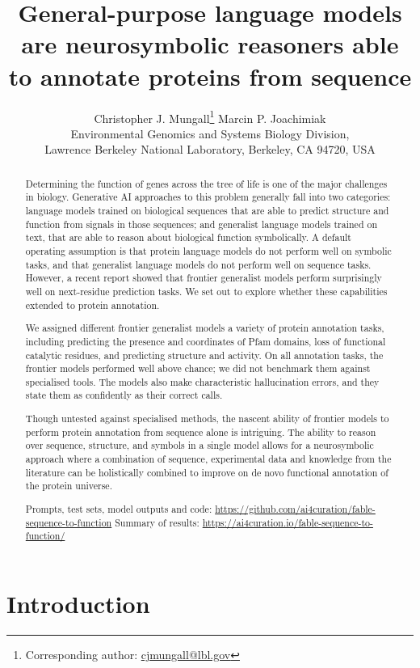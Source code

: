 \documentclass[11pt]{article}
\title{General-purpose language models are neurosymbolic reasoners able to annotate proteins from sequence}
\author{Christopher J. Mungall\thanks{Corresponding author: \href{mailto:cjmungall@lbl.gov}{cjmungall@lbl.gov}} \qquad Marcin P. Joachimiak\\[1ex]
\small Environmental Genomics and Systems Biology Division,\\
\small Lawrence Berkeley National Laboratory, Berkeley, CA 94720, USA}
\date{}
\begin{document}
\maketitle

\begin{abstract}
  Determining the function of genes across the tree of life is one of the major challenges in biology. Generative AI approaches
  to this problem generally fall into two categories: language models trained on biological sequences that are able to predict
  structure and function from signals in those sequences; and generalist language models trained on text, that are able to reason
  about biological function symbolically. A default operating assumption is that protein language models do not perform well on symbolic tasks,
  and that generalist language models do not perform well on sequence tasks. However, a recent report showed that frontier generalist models
  perform surprisingly well on next-residue prediction tasks. We set out to explore whether
  these capabilities extended to protein annotation.

  We assigned different frontier generalist models a variety of protein annotation tasks, including predicting the
  presence and coordinates of Pfam domains, loss of functional catalytic residues, and predicting structure and activity. On
  all annotation tasks, the frontier models performed well above chance; we did not benchmark them against specialised tools.
  The models also make characteristic hallucination errors, and they state them as confidently as their correct calls.

  Though untested against specialised methods, the nascent ability of frontier models to perform protein annotation from sequence alone
  is intriguing. The ability to reason over sequence, structure, and symbols in a single model allows for a neurosymbolic approach where
  a combination of sequence, experimental data and knowledge from the literature can be holistically combined to improve on de novo functional annotation of the protein universe.

Prompts, test sets, model outputs and code:\newline
\url{https://github.com/ai4curation/fable-sequence-to-function}\newline
Summary of results: \url{https://ai4curation.io/fable-sequence-to-function/}
\end{abstract}

\section{Introduction}
\end{document}
